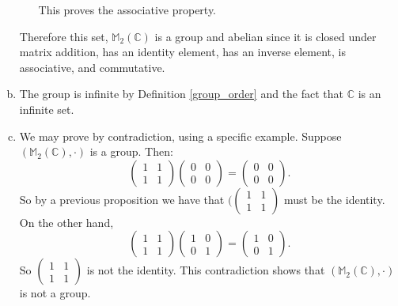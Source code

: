 \begin{enumerate}[(a)]
\begin{itemize}
	This proves the associative property.
	\end{itemize}

Therefore this set, ${\mathbb M}_2 ( {\mathbb C})$ is a group and abelian since it is closed under matrix addition, has an identity element, has an inverse element, is associative, and commutative.

\item
The group is infinite by Definition \ref{group_order} and the fact that ${\mathbb C}$ is an infinite set.

\item
We may prove by contradiction, using a specific example. Suppose $({\mathbb M}_2 ( {\mathbb C}),\cdot)$ is a group. Then:
	$$\begin{pmatrix}
	1 & 1 \\
	1 & 1
	\end{pmatrix}   
	\begin{pmatrix}
	0 & 0 \\
	0 & 0
	\end{pmatrix}  
	= 
	\begin{pmatrix}
	0 & 0 \\
	0 & 0
	\end{pmatrix}.$$
So by a previous proposition we have that 
$(\begin{pmatrix}
	1 & 1 \\
	1 & 1
	\end{pmatrix} $
must be the identity. On the other hand,
	$$\begin{pmatrix}
	1 & 1 \\
	1 & 1
	\end{pmatrix}   
	\begin{pmatrix}
	1 & 0 \\
	0 & 1
	\end{pmatrix}  
	= 
	\begin{pmatrix}
	1 & 0 \\
	0 & 1
	\end{pmatrix}.$$
So 
$\begin{pmatrix}
	1 & 1 \\
	1 & 1
	\end{pmatrix} $
  is not the identity.   This contradiction  shows that  $({\mathbb M}_2 ( {\mathbb C}),\cdot)$ is not a group.
\end{enumerate}

